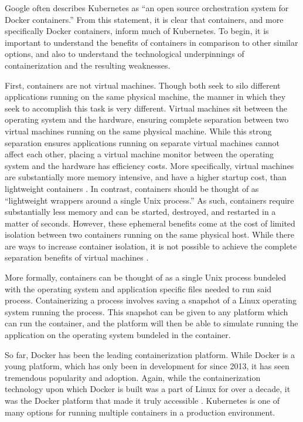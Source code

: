 Google often describes Kubernetes as ``an open source orchestration system for
Docker containers.''\cite{k8s-website} From this statement, it is clear that
containers, and more specifically Docker containers, inform much of Kubernetes.
To begin, it is important to understand the benefits of containers in comparison
to other similar options, and also to understand the technological underpinnings
of containerization and the resulting weaknesses.

First, containers are not virtual machines. Though both seek to silo different
applications running on the same physical machine, the manner in which they
seek to accomplish this task is very different. Virtual machines sit between the
operating system and the hardware, ensuring complete separation between two
virtual machines running on the same physical machine. While this strong
separation ensures applications running on separate virtual machines cannot
affect each other, placing a virtual machine monitor between the operating
system and the hardware has efficiency costs. More specifically, virtual
machines are substantially more memory intensive, and have a higher startup cost,
than lightweight containers \cite{distributed-systems-principles-and-paradigms}.
In contrast, containers should be thought of as ``lightweight wrappers around a
single Unix process.''\cite[pg. 15]{docker-up-and-running} As such, containers
require substantially less memory and can be started, destroyed, and restarted
in a matter of seconds. However, these ephemeral benefits come at the cost of
limited isolation between two containers running on the same physical host.
While there are ways to increase container isolation, it is not possible to
achieve the complete separation benefits of virtual
machines \cite{docker-up-and-running}.

More formally, containers can be thought of as a single Unix process bundeled
with the operating system and application specific files needed to run said process.
Containerizing a process involves saving a snapshot of a Linux operating system
running the process. This snapshot can be given to any platform which can run
the container, and the platform will then be able to simulate running the
application on the operating system bundeled in the container.

So far, Docker has been the leading containerization platform. While Docker is a
young platform, which has only been in development for since 2013, it has seen
tremendous popularity and adoption. Again, while the containerization technology
upon which Docker is built was a part of Linux for over a decade, it was the
Docker platform that made it truly accessible \cite{docker-up-and-running}.
Kubernetes is one of many options for running multiple containers in a
production environment.

